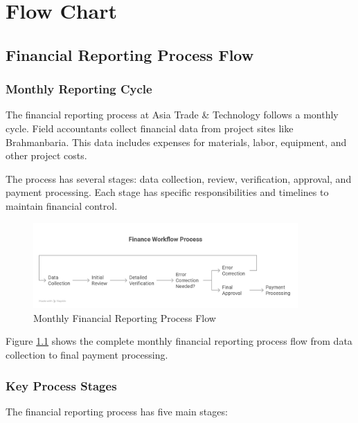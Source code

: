 
\chapter{Flow Chart}

\section{Financial Reporting Process Flow}

\subsection{Monthly Reporting Cycle}
The financial reporting process at Asia Trade \& Technology follows a monthly cycle. Field accountants collect financial data from project sites like Brahmanbaria. This data includes expenses for materials, labor, equipment, and other project costs.

The process has several stages: data collection, review, verification, approval, and payment processing. Each stage has specific responsibilities and timelines to maintain financial control.

\vspace{0.5em}
\begin{figure}[H]
    \centering
    \includegraphics[width=0.9\textwidth]{assets/images/financial_flowchart.png}
    \caption{Monthly Financial Reporting Process Flow}
    \label{fig:financial_flowchart}
\end{figure}

Figure \ref{fig:financial_flowchart} shows the complete monthly financial reporting process flow from data collection to final payment processing.

\subsection{Key Process Stages}
The financial reporting process has five main stages:


